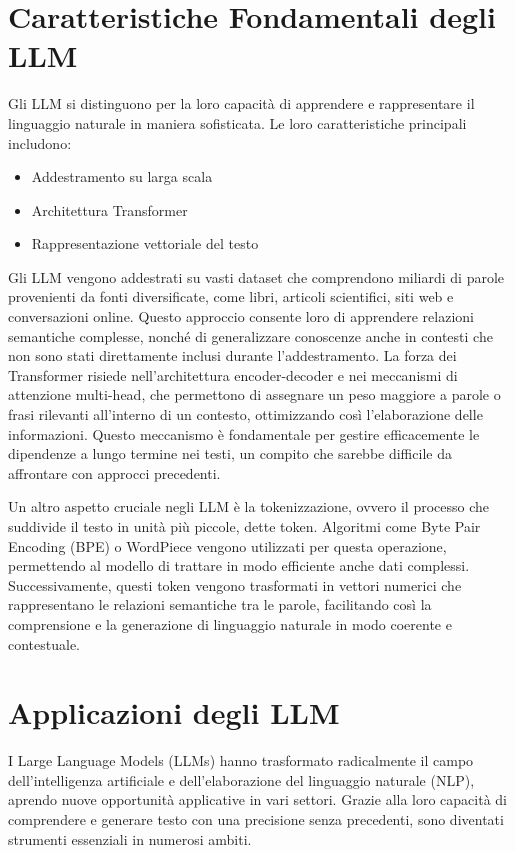 \documentclass[a4paper,twoside,12pt]{toptesi}
\begin{document}
\section{Caratteristiche Fondamentali degli LLM}

Gli LLM si distinguono per la loro capacità di apprendere e rappresentare il linguaggio naturale in maniera sofisticata. Le loro caratteristiche principali includono:
\begin{itemize}
\item Addestramento su larga scala
\item Architettura Transformer
\item Rappresentazione vettoriale del testo
\end{itemize}

Gli LLM vengono addestrati su vasti dataset che comprendono miliardi di parole provenienti da fonti diversificate, come libri, articoli scientifici, siti web e conversazioni online. Questo approccio consente loro di apprendere relazioni semantiche complesse, nonché di generalizzare conoscenze anche in contesti che non sono stati direttamente inclusi durante l'addestramento. La forza dei Transformer risiede nell'architettura encoder-decoder e nei meccanismi di attenzione multi-head, che permettono di assegnare un peso maggiore a parole o frasi rilevanti all'interno di un contesto, ottimizzando così l'elaborazione delle informazioni. Questo meccanismo è fondamentale per gestire efficacemente le dipendenze a lungo termine nei testi, un compito che sarebbe difficile da affrontare con approcci precedenti.

Un altro aspetto cruciale negli LLM è la tokenizzazione, ovvero il processo che suddivide il testo in unità più piccole, dette token. Algoritmi come Byte Pair Encoding (BPE) o WordPiece vengono utilizzati per questa operazione, permettendo al modello di trattare in modo efficiente anche dati complessi. Successivamente, questi token vengono trasformati in vettori numerici che rappresentano le relazioni semantiche tra le parole, facilitando così la comprensione e la generazione di linguaggio naturale in modo coerente e contestuale.

\section{Applicazioni degli LLM}
I Large Language Models (LLMs) hanno trasformato radicalmente il campo dell'intelligenza artificiale e dell'elaborazione del linguaggio naturale (NLP), aprendo nuove opportunità applicative in vari settori. Grazie alla loro capacità di comprendere e generare testo con una precisione senza precedenti, sono diventati strumenti essenziali in numerosi ambiti.
\end{document}
